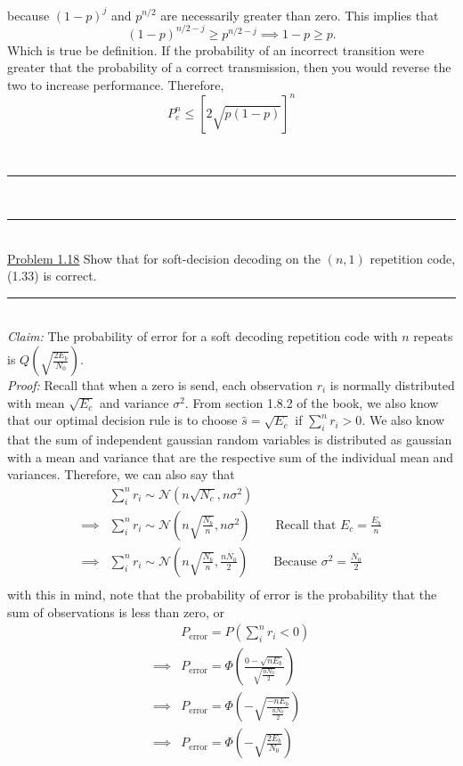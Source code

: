 \documentclass{article}
\newcommand{\problemsep}{\leavevmode\\[0.05in] \rule[\baselineskip/4]{\textwidth}{1pt} \\[0.005in] \rule[\baselineskip]{\textwidth}{1pt}\vspace{-\baselineskip}\leavevmode\\[0.05in]}
\newcommand{\statementsep}{\leavevmode\\[0.005in] \rule[\baselineskip/4]{\textwidth}{0.4pt}\leavevmode\\[0.005in]}
\begin{document}
\begin{enumerate}[(a)]
\begin{equation*}
				\end{equation*}
				because $(1 - p)^j$ and $p^{n/2}$ are necessarily greater than zero. This implies that
				\begin{equation*}
					(1 - p)^{n/2 - j} \ge p^{n/2 - j} \implies 1 - p \ge p.
				\end{equation*}
				Which is true be definition. If the probability of an incorrect transition were greater that the probability of a correct transmission, then you would reverse the two to increase performance. Therefore, 
				\begin{equation*}
					P_e^n \le \left [ 2\sqrt{p(1 - p)}\right ]^n
				\end{equation*}
\end{enumerate}
\problemsep
\noindent\underline{Problem 1.18}
Show that for soft-decision decoding on the $(n,1)$ repetition code, (1.33) is correct.
\statementsep
{\it Claim: } The probability of error for a soft decoding repetition code with $n$ repeats is $Q\left ( \sqrt{\frac{2E_b}{N_0}}\right )$. \\[0.05in]
{\it Proof: } Recall that when a zero is send, each observation $r_i$ is normally distributed with mean $\sqrt{E_c}$ and variance $\sigma^2$. From section 1.8.2 of the book, we also know that our optimal decision rule is to choose $\hat{s} = \sqrt{E_c}$ if $\sum_i^n r_i > 0$. We also know that the sum of independent gaussian random variables is distributed as gaussian with a mean and variance that are the respective sum of the individual mean and variances. Therefore, we can also say that
\begin{equation*}\begin{aligned}
	       & \sum_i^nr_i \sim \mathcal{N}(n\sqrt{N_c},n\sigma^2)\\
\implies & \sum_i^nr_i \sim \mathcal{N}\left (n\sqrt{\frac{N_b}{n}},n\sigma^2 \right ) \qquad \text{Recall that $E_c = \frac{E_b}{n}$}\\
\implies & \sum_i^nr_i \sim \mathcal{N}\left (n\sqrt{\frac{N_b}{n}},\frac{nN_0}{2} \right ) \qquad \text{Because $\sigma^2 = \frac{N_0}{2}$}\\
\end{aligned}\end{equation*}
with this in mind, note that the probability of error is the probability that the sum of observations is less than zero, or 
\begin{equation*}\begin{aligned} 
         & P_{\text{error}} = P\left (\sum_i^nr_i < 0\right ) \\
\implies & P_{\text{error}} = \Phi \left ( \frac{0 - \sqrt{nE_b}}{\sqrt{\frac{nN_0}{2}}} \right ) 	\\
\implies & P_{\text{error}} = \Phi \left ( -\sqrt{\frac{- nE_b}{\frac{nN_0}{2}}} \right ) 	\\
\implies & P_{\text{error}} = \Phi \left ( -\sqrt{\frac{2E_b}{N_0}} \right ) 	\\
\end{aligned}\end{equation*}
\end{document}
